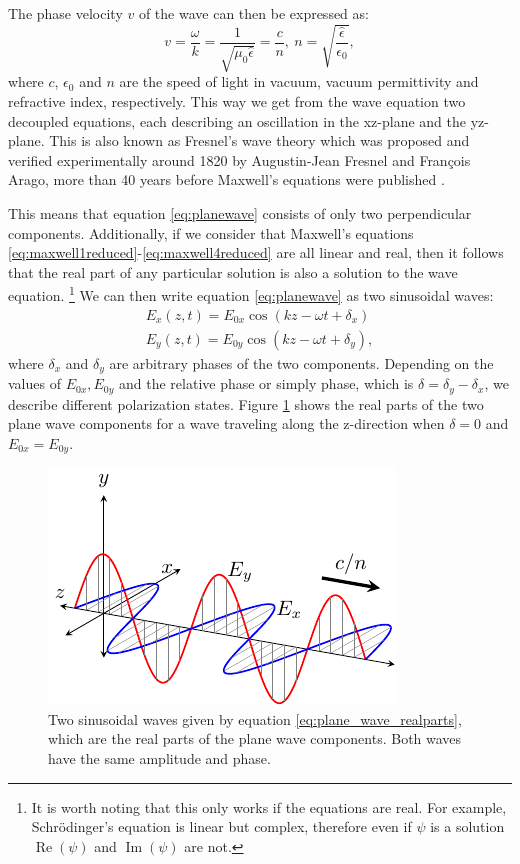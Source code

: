 The phase velocity $v$ of the wave can then be expressed as:
\begin{equation}
    v = \frac{\omega}{k} = \frac{1}{\sqrt{\mu_0 \hat{\epsilon}}} = \frac{c}{n},\:n = \sqrt{\frac{\hat{\epsilon}}{\epsilon_0}},
\end{equation}
where $c$, $\epsilon_0$ and $n$ are the speed of light in vacuum, vacuum permittivity and refractive index, respectively. This way we get from the wave equation two decoupled equations, each describing an oscillation in the xz-plane and the yz-plane. This is also known as Fresnel's wave theory which was proposed and verified experimentally around 1820 by Augustin-Jean Fresnel and François Arago, more than 40 years before Maxwell's equations were published \cite{Collett2009,Jackson1998}.

This means that equation \ref{eq:planewave} consists of only two perpendicular components. Additionally, if we consider that Maxwell's equations \ref{eq:maxwell1reduced}-\ref{eq:maxwell4reduced} are all linear and real, then it follows that the real part of any particular solution is also a solution to the wave equation. \footnote{It is worth noting that this only works if the equations are real. For example, Schrödinger's equation is linear but complex, therefore even if $\psi$ is a solution $\operatorname{Re}(\psi)$ and $\operatorname{Im}(\psi)$ are not.} We can then write equation \ref{eq:planewave} as two sinusoidal waves:
\begin{equation}
\label{eq:plane_wave_realparts}
\begin{aligned}
    E_x(z, t) = E_{0x}\cos(kz-\omega t + \delta_x) \\
    E_y(z, t) = E_{0y}\cos(kz-\omega t + \delta_y), 
\end{aligned}
\end{equation}
where $\delta_x$ and $\delta_y$ are arbitrary phases of the two components. Depending on the values of $E_{0x}, E_{0y}$ and the relative phase or simply phase, which is $\delta = \delta_y - \delta_x$, we describe different polarization states. Figure \ref{fig:Ex_Ey_planewaves} shows the real parts of the two plane wave components for a wave traveling along the z-direction when $\delta=0$ and $E_{0x}=E_{0y}$.

\begin{figure}[h]
    \centering
    \includegraphics[scale=1]{images/theory/tikz_e_wave.pdf}
    \caption{Two sinusoidal waves given by equation \ref{eq:plane_wave_realparts}, which are the real parts of the plane wave components. Both waves have the same amplitude and phase.}
    \label{fig:Ex_Ey_planewaves}
\end{figure}

